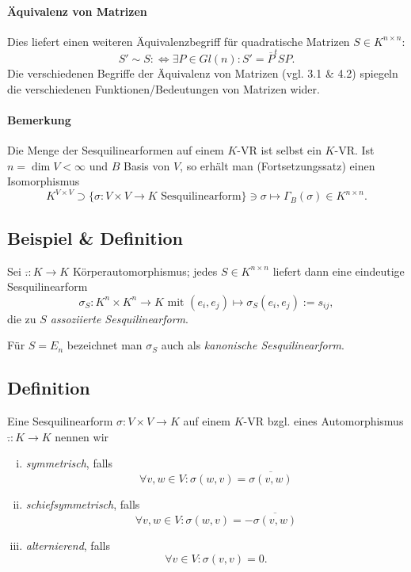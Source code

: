 \paragraph{Äquivalenz von Matrizen}
Dies liefert einen weiteren Äquivalenzbegriff für quadratische Matrizen $ S\in K^{n\times n} $:
		\[ S' \sim S :\Leftrightarrow \exists  P\in Gl(n): S' = \overline{P}^tSP. \]
	Die verschiedenen Begriffe der Äquivalenz von Matrizen (vgl. 3.1 \& 4.2) spiegeln die verschiedenen Funktionen/Bedeutungen von Matrizen wider.
	
\paragraph{Bemerkung}
	Die Menge der Sesquilinearformen auf einem $ K $-VR ist selbst ein $ K $-VR. Ist $ n=\dim V< \infty $ und $ B $ Basis von $ V $, so erhält man (Fortsetzungssatz) einen Isomorphismus
		\[ K^{V\times V}\supset \{\sigma:V\times V\to K \text{ Sesquilinearform}\}\ni \sigma \mapsto \Gamma_B(\sigma)\in K^{n\times n}. \]
\subsection{Beispiel \& Definition} 
\begin{Definition}
	Sei $ \bar{.}:K\to K $ Körperautomorphismus; jedes $ S\in K^{n\times n} $ liefert dann eine eindeutige Sesquilinearform
		\[ \sigma_S:K^n\times K^n \to K \text{ mit } (e_i,e_j)\mapsto \sigma_S(e_i,e_j):= s_{ij}, \] 
	die zu \emph{$ S $ assoziierte Sesquilinearform}.

	Für $ S = E_n $ bezeichnet man $ \sigma_S $ auch als \emph{kanonische Sesquilinearform}.
\end{Definition}

\subsection{Definition}
\begin{Definition}
	Eine Sesquilinearform $ \sigma:V\times V\to K $ auf einem $ K $-VR bzgl. eines Automorphismus $ \bar{.}:K\to K $ nennen wir
		\begin{enumerate}[(i)]
			\item \emph{symmetrisch}, falls
				\[ \forall v,w\in V: \sigma(w,v) = \overline{\sigma(v,w)} \]
			\item \emph{schiefsymmetrisch}, falls
				\[ \forall v,w\in V: \sigma(w,v) = - \overline{\sigma(v,w)} \]
			\item \emph{alternierend}, falls
				\[ \forall v \in V: \sigma(v,v) = 0. \]
		\end{enumerate}
\end{Definition}

